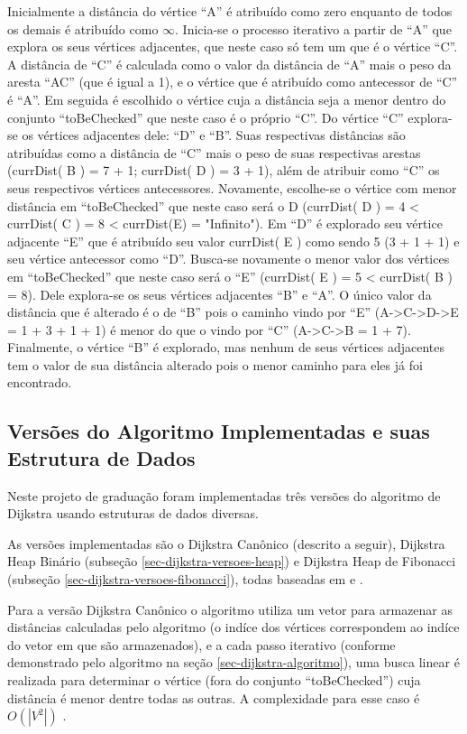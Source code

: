 Inicialmente a distância do vértice ``A'' é atribuído como zero enquanto de todos os demais é atribuído como $\infty$. Inicia-se o processo iterativo a partir de ``A'' que explora os seus vértices adjacentes, que neste caso só tem um que é o vértice ``C''. A distância de ``C'' é calculada como o valor da distância de ``A'' mais o peso da aresta ``AC'' (que é igual a 1), e o vértice que é atribuído como antecessor de ``C'' é ``A''. Em seguida é escolhido o vértice cuja a distância seja a menor dentro do conjunto ``toBeChecked'' que neste caso é o próprio ``C''. Do vértice ``C'' explora-se os vértices adjacentes dele: ``D'' e ``B''. Suas respectivas distâncias são atribuídas como a distância de ``C'' mais o peso de suas respectivas arestas (currDist( B ) = 7 + 1; currDist( D ) = 3 + 1), além de atribuir como ``C'' os seus respectivos vértices antecessores. Novamente, escolhe-se o vértice com menor distância em ``toBeChecked'' que neste caso será o D (currDist( D ) = 4 < currDist( C ) = 8 < currDist(E) = "Infinito"). Em ``D'' é explorado seu vértice adjacente ``E'' que é atribuído seu valor currDist( E ) como sendo 5 (3 + 1 + 1) e seu vértice antecessor como ``D''. Busca-se novamente o menor valor dos vértices em ``toBeChecked'' que neste caso será o ``E'' (currDist( E ) = 5 < currDist( B ) = 8). Dele explora-se os seus vértices adjacentes ``B'' e ``A''. O único valor da distância que é alterado é o de ``B'' pois o caminho vindo por ``E'' (A->C->D->E = 1 + 3 + 1 + 1) é menor do que o vindo por ``C''  (A->C->B = 1 + 7). Finalmente, o vértice ``B'' é explorado, mas nenhum de seus vértices adjacentes tem o valor de sua distância alterado pois o menor caminho para eles já foi encontrado.

\subsection{Versões do Algoritmo Implementadas e suas Estrutura de Dados}
\label{sec-dijkstra-versoes}
Neste projeto de graduação foram implementadas três versões do algoritmo de Dijkstra usando estruturas de dados diversas.

As versões implementadas são o Dijkstra Canônico (descrito a seguir), Dijkstra Heap Binário (subseção \ref{sec-dijkstra-versoes-heap}) e Dijkstra Heap de Fibonacci (subseção \ref{sec-dijkstra-versoes-fibonacci}), todas baseadas em  e .

Para a versão Dijkstra Canônico o algoritmo utiliza um vetor para armazenar as distâncias calculadas pelo algoritmo (o indíce dos vértices correspondem ao indíce do vetor em que são armazenados), e a cada passo iterativo (conforme demonstrado pelo algoritmo na seção \ref{sec-dijkstra-algoritmo}), uma busca linear é realizada para determinar o vértice (fora do conjunto ``toBeChecked'') cuja distância é menor dentre todas as outras. A complexidade para esse caso é $O(|V^{2}|)$ \cite{drozdek2012data}.

